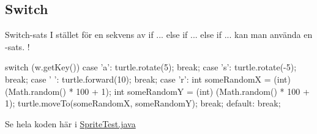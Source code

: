 \documentclass{lecturenotes}
\begin{document}

\subsection{Switch}
\begin{Slide}{Switch-sats}
I stället för en sekvens av if ... else if ... else if ... kan man använda en -sats.  !
\begin{Code}[basicstyle=\ttfamily\fontsize{7}{8}\selectfont]
    switch (w.getKey()) {
    case 'a':
        turtle.rotate(5);
        break;
    case 's':
        turtle.rotate(-5);
        break;
    case ' ':
        turtle.forward(10);
        break;
    case 'r':
        int someRandomX = (int) (Math.random() * 100 + 1);
        int someRandomY = (int) (Math.random() * 100 + 1);
        turtle.moveTo(someRandomX, someRandomY);
        break;
    default:
        break;
    }
\end{Code}
Se hela koden här i \href{https://github.com/bjornregnell/lth-eda016-2015/blob/master/lectures/examples/eclipse-ws/cs_pt/src/se/lth/cs/pt/window/SpriteTest.java}{SpriteTest.java}
\end{Slide} 
            
\end{document}
